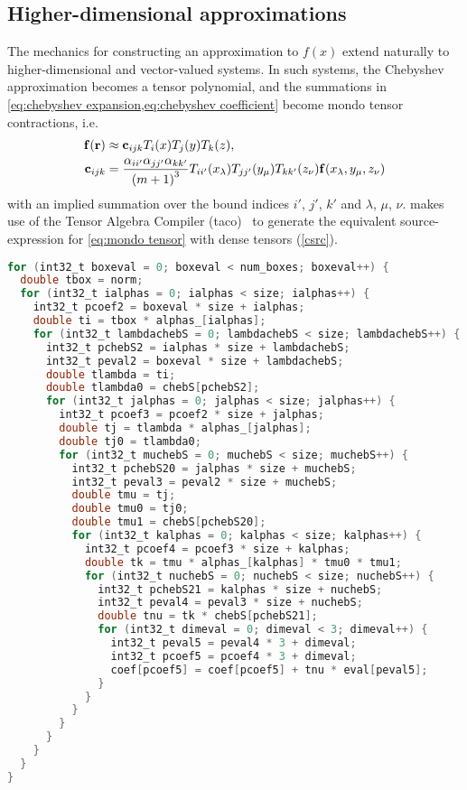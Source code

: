 \subsection{Higher-dimensional approximations}
The mechanics for constructing an approximation to $f(x)$ extend naturally to higher-dimensional and vector-valued systems.
In such systems, the Chebyshev approximation becomes a tensor polynomial, and the summations in \cref{eq:chebyshev expansion,eq:chebyshev coefficient} become mondo tensor contractions, i.e.
\begin{subequations}
  \begin{align}
    \vb{f}(\vb{r}) &\approx \vb{c}_{ijk} T_i(x) T_j(y) T_k(z), \\
    \vb{c}_{ijk} &= \frac{\alpha_{ii'} \alpha_{jj'} \alpha_{kk'}}{\qty(m+1)^3} T_{ii'}(x_\lambda) T_{jj'}(y_\mu) T_{kk'}(z_\nu) \vb{f}(x_\lambda, y_\mu, z_\nu) \label{eq:mondo tensor}
  \end{align}
\end{subequations}
with an implied summation over the bound indices $i'$, $j'$, $k'$ and $\lambda$, $\mu$, $\nu$.
\QuEST{} makes use of the Tensor Algebra Compiler (taco)~\cite{taco} to generate the equivalent source-expression for \cref{eq:mondo tensor} with dense tensors (\cref{csrc}).
\begin{lstlisting}[language=C, caption={C-source expression for \cref{eq:mondo tensor}.}, label=csrc]
for (int32_t boxeval = 0; boxeval < num_boxes; boxeval++) {
  double tbox = norm;
  for (int32_t ialphas = 0; ialphas < size; ialphas++) {
    int32_t pcoef2 = boxeval * size + ialphas;
    double ti = tbox * alphas_[ialphas];
    for (int32_t lambdachebS = 0; lambdachebS < size; lambdachebS++) {
      int32_t pchebS2 = ialphas * size + lambdachebS;
      int32_t peval2 = boxeval * size + lambdachebS;
      double tlambda = ti;
      double tlambda0 = chebS[pchebS2];
      for (int32_t jalphas = 0; jalphas < size; jalphas++) {
        int32_t pcoef3 = pcoef2 * size + jalphas;
        double tj = tlambda * alphas_[jalphas];
        double tj0 = tlambda0;
        for (int32_t muchebS = 0; muchebS < size; muchebS++) {
          int32_t pchebS20 = jalphas * size + muchebS;
          int32_t peval3 = peval2 * size + muchebS;
          double tmu = tj;
          double tmu0 = tj0;
          double tmu1 = chebS[pchebS20];
          for (int32_t kalphas = 0; kalphas < size; kalphas++) {
            int32_t pcoef4 = pcoef3 * size + kalphas;
            double tk = tmu * alphas_[kalphas] * tmu0 * tmu1;
            for (int32_t nuchebS = 0; nuchebS < size; nuchebS++) {
              int32_t pchebS21 = kalphas * size + nuchebS;
              int32_t peval4 = peval3 * size + nuchebS;
              double tnu = tk * chebS[pchebS21];
              for (int32_t dimeval = 0; dimeval < 3; dimeval++) {
                int32_t peval5 = peval4 * 3 + dimeval;
                int32_t pcoef5 = pcoef4 * 3 + dimeval;
                coef[pcoef5] = coef[pcoef5] + tnu * eval[peval5];
              }
            }
          }
        }
      }
    }
  }
}
\end{lstlisting}
